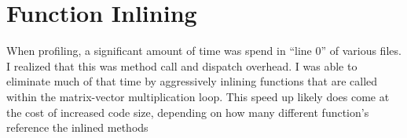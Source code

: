 \documentclass{article}
\begin{document}
\section{Function Inlining}
When profiling, a significant amount of time was spend in ``line 0'' of various files.
I realized that this was method call and dispatch overhead.
I was able to eliminate much of that time by aggressively inlining functions that are called within the matrix-vector multiplication loop.
This speed up likely does come at the cost of increased code size, depending on how many different function's reference the inlined methods
\end{document}
